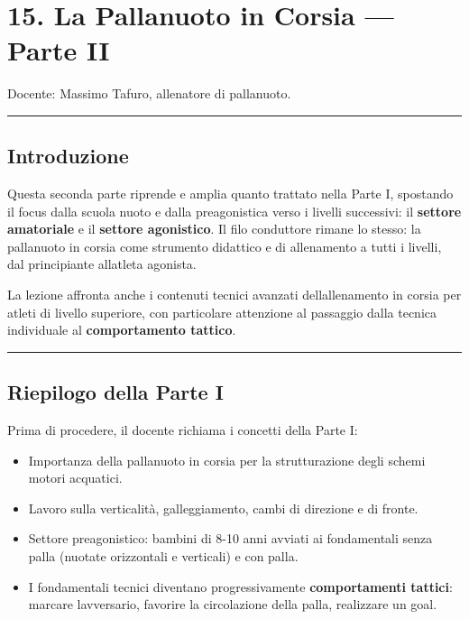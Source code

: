 \documentclass[a4paper,11pt]{article}
\providecommand{\tightlist}{%
  \setlength{\itemsep}{0pt}\setlength{\parskip}{0pt}}
\begin{document}
\section{15. La Pallanuoto in Corsia --- Parte
  II}\label{la-pallanuoto-in-corsia-parte-ii}

Docente: Massimo Tafuro, allenatore di pallanuoto.

\begin{center}\rule{0.5\linewidth}{0.5pt}\end{center}

\subsection{Introduzione}\label{introduzione-14}

Questa seconda parte riprende e amplia quanto trattato nella Parte I,
spostando il focus dalla scuola nuoto e dalla preagonistica verso i
livelli successivi: il \textbf{settore amatoriale} e il \textbf{settore
      agonistico}. Il filo conduttore rimane lo stesso: la pallanuoto in
corsia come strumento didattico e di allenamento a tutti i livelli, dal
principiante all\textquotesingle atleta agonista.

La lezione affronta anche i contenuti tecnici avanzati
dell\textquotesingle allenamento in corsia per atleti di livello
superiore, con particolare attenzione al passaggio dalla tecnica
individuale al \textbf{comportamento tattico}.

\begin{center}\rule{0.5\linewidth}{0.5pt}\end{center}

\subsection{Riepilogo della Parte I}\label{riepilogo-della-parte-i}

Prima di procedere, il docente richiama i concetti della Parte I:

\begin{itemize}
      \tightlist
      \item
            Importanza della pallanuoto in corsia per la strutturazione degli
            schemi motori acquatici.
      \item
            Lavoro sulla verticalità, galleggiamento, cambi di direzione e di
            fronte.
      \item
            Settore preagonistico: bambini di 8-10 anni avviati ai fondamentali
            senza palla (nuotate orizzontali e verticali) e con palla.
      \item
            I fondamentali tecnici diventano progressivamente
            \textbf{comportamenti tattici}: marcare l\textquotesingle avversario,
            favorire la circolazione della palla, realizzare un goal.
\end{itemize}
\end{document}
